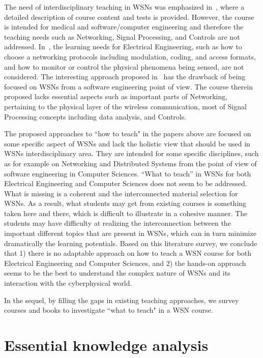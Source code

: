 \documentclass[onecolumn,12pt,draftclsnofoot,a4paper,peerreview]{IEEEtran}
\begin{document}
The need of interdisciplinary teaching in WSNs was emphasized in~\cite{5598548}, where a detailed description of course content and tests is provided. However, the course is intended for medical and software/computer engineering and therefore the teaching needs such as Networking, Signal Processing, and Controls are not addressed. In~\cite{Rollins11}, the learning needs for Electrical Engineering, such as how to choose a networking protocols including modulation, coding, and access formats, and how to monitor or control the physical phenomena being sensed, are not considered. The interesting approach proposed in~\cite{Feonster+10} has the drawback of being focused on WSNs from a software engineering point of view. The course therein proposed lacks essential aspects such as important parts of Networking, pertaining to the physical layer of the wireless communication, most of Signal Processing concepts including data analysis, and Controls.

The proposed approaches to ``how to teach" in the papers above are focused on some specific aspect of WSNs and lack the holistic view that should be used in WSNs interdisciplinary area. They are intended for some specific disciplines, such as for example on Networking and Distributed Systems from the point of view of software engineering in Computer Sciences. ``What to teach'' in WSNs for both Electrical Engineering and Computer Sciences does not seem to be addressed. What is missing is a coherent and the interconnected material selection for WSNs. As a result, what students may get from existing courses is something taken here and there, which is difficult to illustrate in a cohesive manner. The students may have difficulty at realizing the interconnection between the important different topics that are present in WSNs, which can in turn minimize dramatically the learning potentials. Based on this literature survey, we conclude that 1) there is no adaptable approach on how to teach a WSN course for both Electrical Engineering and Computer Sciences, and 2) the hands-on approach seems to be the best to understand the complex nature of WSNs and its interaction with the cyberphysical world. 

In the sequel, by filling the gaps in existing teaching approaches, we survey courses and books to investigate ``what to teach" in a WSN course.


\section{Essential knowledge analysis} \label{relevant knowledge}
\end{document}
